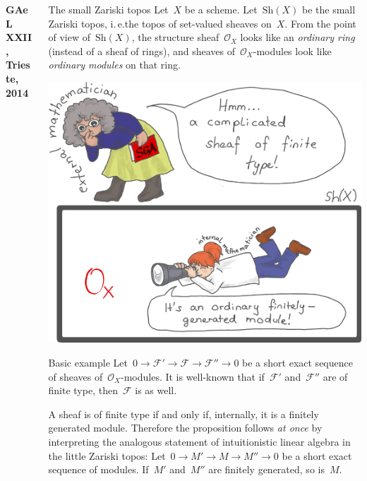 \documentclass[table]{beamer}
\newcommand{\F}{\mathcal{F}}
\renewcommand{\O}{\mathcal{O}}
\newcommand{\Sh}{\mathrm{Sh}}
\begin{document}
\begin{frame}[t]
\begin{columns}[t]
\begin{column}{0.3\textwidth}
  \vspace{0.7cm}
  \textbf{GAeL XXII, Trieste, 2014}
\end{column}

\begin{column}{0.3\textwidth}
  \begin{block}{The small Zariski topos}
    Let~$X$ be a scheme. Let~$\Sh(X)$ be the small Zariski topos, i.\,e.\@ the
    topos of set-valued sheaves on~$X$. From the point of view of~$\Sh(X)$,
    the structure sheaf~$\O_X$ looks like an \emph{ordinary ring} (instead of a
    sheaf of rings), and sheaves of~$\O_X$-modules look like \emph{ordinary
    modules} on that ring.\bigskip

    \includegraphics[width=\columnwidth]{external-internal}
  \end{block}
  \bigskip

  \begin{block}{Basic example}
    Let~$0 \to \F' \to \F \to \F'' \to 0$ be a short exact sequence of sheaves
    of~$\O_X$-modules. It is well-known that if~$\F'$ and~$\F''$ are of finite type,
    then~$\F$ is as well.\medskip

    A sheaf is of finite type if and only if, internally, it is a
    finitely generated module. Therefore the proposition follows \emph{at once}
    by interpreting the analogous statement of intuitionistic linear algebra
    in the little Zariski topos:
    Let~$0 \to M' \to M \to M'' \to 0$ be a short exact sequence of modules.
    If~$M'$ and~$M''$ are finitely generated, so is~$M$.\medskip


\end{block}
\end{column}
\end{columns}
\end{frame}
\end{document}
